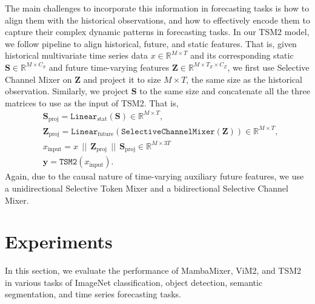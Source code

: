 \documentclass{article}
\newcommand{\R}[0]{\mathbb{R}}
\newcommand*\circled[1]{\tikz[baseline=(char.base)]{
            \node[shape=circle,draw,inner sep=0.3pt, fill=c2] (char) {\textcolor{white}{#1}};}}
\begin{document}
The main challenges to incorporate this information in forecasting tasks is \circled{1} how to align them with the historical observations, and \circled{2} how to effectively encode them to capture their complex dynamic patterns in forecasting tasks. In our TSM2 model, we follow \citet{chen2023tsmixer} pipeline to align historical, future, and static features. That is, given historical multivariate time series data $x \in \R^{M \times T}$ and its corresponding static $\mathbf{S} \in \R^{M \times C_S}$ and future time-varying features $\mathbf{Z} \in \R^{M \times T_Z \times C_Z}$, we first use Selective Channel Mixer on $\mathbf{Z}$ and project it to size $M \times T$, the same size as the historical observation. Similarly, we project $\mathbf{S}$ to the same size and concatenate all the three matrices to use as the input of TSM2. That is, 
\begin{align}
    &\mathbf{S}_{\text{proj}} = \texttt{Linear}_{\text{stat}}(\mathbf{S}) \in \R^{M \times T}, \\
    & \mathbf{Z}_{\text{proj}} = \texttt{Linear}_{\text{future}}\left(\texttt{SelectiveChannelMixer}\left( \mathbf{Z} \right)\right) \in \R^{M \times T},\\
    & x_{\text{input}} = x \:\: || \:\: \mathbf{Z}_{\text{proj}} \:\: || \:\: \mathbf{S}_{\text{proj}} \in \R^{M \times 3T}\\
    & \mathbf{y} = \texttt{TSM2}\left( x_{\text{input}} \right).
\end{align}
Again, due to the causal nature of time-varying auxiliary future features, we use a unidirectional Selective Token Mixer and a bidirectional Selective Channel Mixer. 










\section{Experiments}
In this section, we evaluate the performance of MambaMixer, ViM2, and TSM2 in various tasks of ImageNet classification, object detection, semantic segmentation, and time series forecasting tasks.
\end{document}
